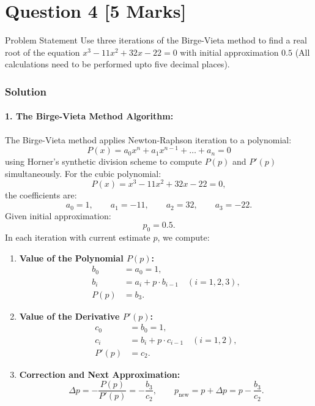 \documentclass[11pt,a4paper]{article}
\begin{document}
\vspace{0.8cm}

\section*{Question 4 \hfill \normalsize [5 Marks]}

\begin{questionbox}{Problem Statement}
Use three iterations of the Birge-Vieta method to find a real root of the equation $x^3 - 11x^2 + 32x - 22 = 0$ with initial approximation $0.5$ (All calculations need to be performed upto five decimal places).
\end{questionbox}

\subsubsection*{Solution}

\paragraph{1. The Birge-Vieta Method Algorithm:}
The Birge-Vieta method applies Newton-Raphson iteration to a polynomial:
\[
P(x) = a_0 x^n + a_1 x^{n-1} + \dots + a_n = 0
\]
using Horner's synthetic division scheme to compute $P(p)$ and $P'(p)$ simultaneously.
For the cubic polynomial:
\[
P(x) = x^3 - 11x^2 + 32x - 22 = 0,
\]
the coefficients are:
\[
a_0 = 1, \qquad a_1 = -11, \qquad a_2 = 32, \qquad a_3 = -22.
\]
Given initial approximation:
\[
p_0 = 0.5.
\]
In each iteration with current estimate $p$, we compute:
\begin{enumerate}[label=(\alph*)]
    \item \textbf{Value of the Polynomial $P(p)$:}
    \begin{align*}
    b_0 &= a_0 = 1, \\
    b_i &= a_i + p \cdot b_{i-1} \quad (i = 1, 2, 3), \\
    P(p) &= b_3.
    \end{align*}
    \item \textbf{Value of the Derivative $P'(p)$:}
    \begin{align*}
    c_0 &= b_0 = 1, \\
    c_i &= b_i + p \cdot c_{i-1} \quad (i = 1, 2), \\
    P'(p) &= c_2.
    \end{align*}
    \item \textbf{Correction and Next Approximation:}
    \[
    \Delta p = -\frac{P(p)}{P'(p)} = -\frac{b_3}{c_2}, \qquad p_{\text{new}} = p + \Delta p = p - \frac{b_3}{c_2}.
    \]
\end{enumerate}
\end{document}

